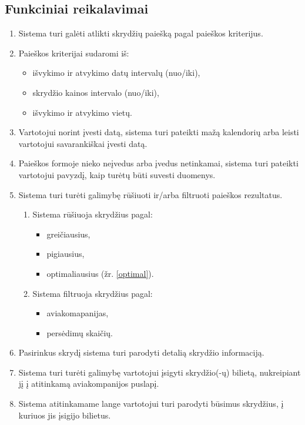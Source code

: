 \documentclass{VUMIFPSkursinis}
\begin{document}
            \subsection{Funkciniai reikalavimai}
                \begin{enumerate}[label=\textbf{FR\arabic*}.]
                    \item Sistema turi galėti atlikti skrydžių paiešką pagal paieškos kriterijus.
                    \item Paieškos kriterijai sudaromi iš:
                    \begin{itemize}
                    	\item išvykimo ir atvykimo datų intervalų (nuo/iki),
                    	\item skrydžio kainos intervalo (nuo/iki),
                    	\item išvykimo ir atvykimo vietų.
                    \end{itemize}
                    \item Vartotojui norint įvesti datą, sistema turi pateikti mažą kalendorių arba leisti vartotojui savarankiškai įvesti datą.
                    \item Paieškos formoje nieko neįvedus arba įvedus netinkamai, sistema turi pateikti vartotojui pavyzdį, kaip turėtų būti suvesti duomenys.
                    \item Sistema turi turėti galimybę rūšiuoti ir/arba  filtruoti paieškos rezultatus.
                    \begin{enumerate}[label*=\textbf{\arabic*}.]
                        \item Sistema rūšiuoja skrydžius pagal:
                        \begin{itemize}
                            \item greičiausius,
                            \item pigiausius,
                            \item optimaliausius (žr. \ref{optimal}).
                        \end{itemize}
                        \item Sistema filtruoja skrydžius pagal:
                        \begin{itemize}
                            \item aviakomapanijas,
                            \item persėdimų skaičių.
                        \end{itemize}
                    \end{enumerate}
                    \item Pasirinkus skrydį sistema turi parodyti detalią skrydžio informaciją.
                    \item Sistema turi turėti galimybę vartotojui įsigyti skrydžio(-ų) bilietą, nukreipiant jį į atitinkamą aviakompanijos puslapį.
                    \item Sistema atitinkamame lange vartotojui turi parodyti būsimus skrydžius, į kuriuos jis įsigijo bilietus.
                \end{enumerate}
\end{document}
